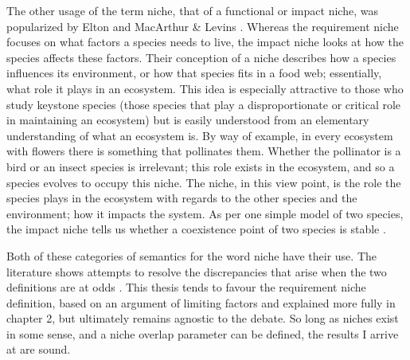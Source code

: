 The other usage of the term niche, that of a functional or impact niche, was popularized by Elton \cite{Elton1927} and MacArthur \& Levins \cite{MacArthur1967}. 
Whereas the requirement niche focuses on what factors a species needs to live, the impact niche looks at how the species affects these factors. 
Their conception of a niche describes how a species influences its environment, or how that species fits in a food web; essentially, what role it plays in an ecosystem. 
This idea is especially attractive to those who study keystone species \cite{May1999,Chesson2000,Leibold2006} (those species that play a disproportionate or critical role in maintaining an ecosystem) but is easily understood from an elementary understanding of what an ecosystem is. 
By way of example, in every ecosystem with flowers there is something that pollinates them. 
Whether the pollinator is a bird or an insect species is irrelevant; this role exists in the ecosystem, and so a species evolves to occupy this niche. 
The niche, in this view point, is the role the species plays in the ecosystem with regards to the other species and the environment; how it impacts the system. 
As per one simple model of two species, the impact niche tells us whether a coexistence point of two species is stable \cite{Tilman1982textbook}. 

Both of these categories of semantics for the word niche have their use.
The literature shows attempts to resolve the discrepancies that arise when the two definitions are at odds \cite{Leibold1995,Leibold2006}. 
This thesis tends to favour the requirement niche definition, based on an argument of limiting factors and explained more fully in chapter 2, but ultimately remains agnostic to the debate. %
So long as niches exist in some sense, and a niche overlap parameter can be defined, the results I arrive at are sound.

